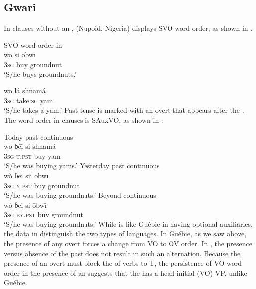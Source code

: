 \documentclass[output=paper,newtxmath,modfonts,nonflat,draftmode]{langsci/langscibook}
\begin{document}
\subsection{Gwari}

In clauses without an ,  (Nupoid, Nigeria) displays SVO word order, as shown in .

\ea \label{ex:10:gwari}
SVO word order in 	\\
\ea 
\gll wo si \=obw\=\i \\
3\textsc{sg} buy groundnut \\
\glt `S/he buys groundnuts.' \hfill \citep[][51]{hyman1970}	

\ex \gll wo lá shnamá \\
3\textsc{sg} take:\textsc{sg} yam \\
\glt `S/he takes a yam.' \hfill \citep[][51]{hyman1970}	
\z
\z
Past tense is marked with an overt  that appears after the . The word order in  clauses is SAuxVO, as shown in :

\ea \label{ex:11:gwari}
\ea  Today past continuous	\\
\gll wo {ɓé\=\i} si shnamá\\
3\textsc{sg} \textsc{t.pst} buy yam \\
\glt `S/he was buying yams.' \hfill \citep[][54]{hyman1970}
\ex Yesterday past continuous	\\
\gll wò {ɓei} sii {\=obw\=\i }\\
3\textsc{sg} \textsc{y.pst} buy groundnut\\
\glt `S/he was buying groundnuts.' \hfill \citep[][54]{hyman1970}
\ex Beyond  continuous	\\
\gll wò {ɓei} si {\=obw\=\i } \\
3\textsc{sg} \textsc{by.pst} buy groundnut \\
\glt `S/he was buying groundnuts.' \hfill \citep[][54]{hyman1970}
\z
\z
While  is like Guébie in having optional auxiliaries, the data in  distinguish the two types of languages. In Guébie, as we saw above, the presence of any overt  forces a change from VO to OV order. In , the presence versus absence of the past  does not result in such an alternation. Because the presence of an overt  must block the  of verbs to T, the persistence of VO word order in the presence of an  suggests that the  has a head-initial (VO) VP, unlike Guébie.
\end{document}
